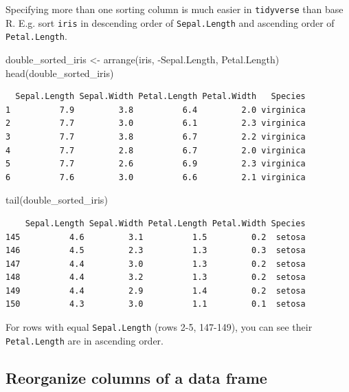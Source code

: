 \documentclass[
  letterpaper,
  DIV=11,
  numbers=noendperiod]{scrreprt}
\newenvironment{Shaded}{\begin{snugshade}}{\end{snugshade}}
\newcommand{\FunctionTok}[1]{\textcolor[rgb]{0.28,0.35,0.67}{#1}}
\newcommand{\NormalTok}[1]{\textcolor[rgb]{0.00,0.23,0.31}{#1}}
\newcommand{\OtherTok}[1]{\textcolor[rgb]{0.00,0.23,0.31}{#1}}
\newcommand{\SpecialCharTok}[1]{\textcolor[rgb]{0.37,0.37,0.37}{#1}}
\begin{document}
Specifying more than one sorting column is much easier in
\texttt{tidyverse} than base R. E.g. sort \texttt{iris} in descending
order of \texttt{Sepal.Length} and ascending order of
\texttt{Petal.Length}.

\begin{Shaded}
\begin{Highlighting}[]
\NormalTok{double\_sorted\_iris }\OtherTok{\textless{}{-}} \FunctionTok{arrange}\NormalTok{(iris, }\SpecialCharTok{{-}}\NormalTok{Sepal.Length, Petal.Length)}
\FunctionTok{head}\NormalTok{(double\_sorted\_iris)}
\end{Highlighting}
\end{Shaded}

\begin{verbatim}
  Sepal.Length Sepal.Width Petal.Length Petal.Width   Species
1          7.9         3.8          6.4         2.0 virginica
2          7.7         3.0          6.1         2.3 virginica
3          7.7         3.8          6.7         2.2 virginica
4          7.7         2.8          6.7         2.0 virginica
5          7.7         2.6          6.9         2.3 virginica
6          7.6         3.0          6.6         2.1 virginica
\end{verbatim}

\begin{Shaded}
\begin{Highlighting}[]
\FunctionTok{tail}\NormalTok{(double\_sorted\_iris)}
\end{Highlighting}
\end{Shaded}

\begin{verbatim}
    Sepal.Length Sepal.Width Petal.Length Petal.Width Species
145          4.6         3.1          1.5         0.2  setosa
146          4.5         2.3          1.3         0.3  setosa
147          4.4         3.0          1.3         0.2  setosa
148          4.4         3.2          1.3         0.2  setosa
149          4.4         2.9          1.4         0.2  setosa
150          4.3         3.0          1.1         0.1  setosa
\end{verbatim}

For rows with equal \texttt{Sepal.Length} (rows 2-5, 147-149), you can
see their \texttt{Petal.Length} are in ascending order.

\subsection{Reorganize columns of a data
frame}\label{reorganize-columns-of-a-data-frame}
\end{document}
